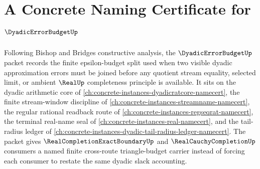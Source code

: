 \chapter{A Concrete Naming Certificate for $\DyadicErrorBudgetUp$}
\label{ch:concrete-instances-dyadic-error-budget-namecert}

Following Bishop and Bridges constructive analysis, the $\DyadicErrorBudgetUp$ packet records the finite epsilon-budget split used when two visible dyadic approximation errors must be joined before any quotient stream equality, selected limit, or ambient $\RealUp$ completeness principle is available. It sits on the dyadic arithmetic core of \autoref{ch:concrete-instances-dyadicratcore-namecert}, the finite stream-window discipline of \autoref{ch:concrete-instances-streamname-namecert}, the regular rational readback route of \autoref{ch:concrete-instances-regseqrat-namecert}, the terminal real-name seal of \autoref{ch:concrete-instances-real-namecert}, and the tail-radius ledger of \autoref{ch:concrete-instances-dyadic-tail-radius-ledger-namecert}. The packet gives $\RealCompletionExactBoundaryUp$ and $\RealCauchyCompletionUp$ consumers a named finite cross-route triangle-budget carrier instead of forcing each consumer to restate the same dyadic slack accounting.

